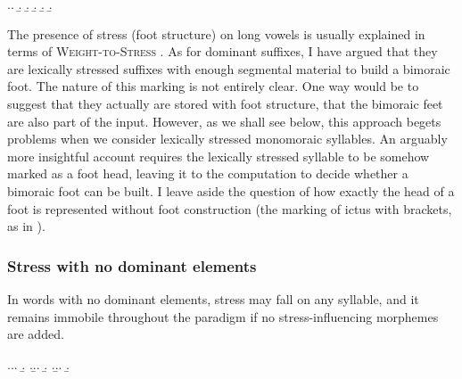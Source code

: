 \ex.\a.
\b.
\b.
\b.
\b.
\b.

The presence of stress (\ie foot structure) on long vowels is usually explained in terms of \textsc{Weight-to-Stress} \citep{prince92:_quant,ot}. As for dominant suffixes, I have argued that they are lexically stressed suffixes with enough segmental material to build a bimoraic foot. The nature of this marking is not entirely clear. One way would be to suggest that they actually are stored with foot structure, \ie that the bimoraic feet are also part of the input. However, as we shall see below, this approach begets problems when we consider lexically stressed monomoraic syllables. An arguably more insightful account requires the lexically stressed syllable to be somehow marked as a foot head, leaving it to the computation to decide whether a bimoraic foot can be built. I leave aside the question of how exactly the head of a foot is represented without foot construction (\cf the marking of ictus with brackets, as in \citealt{idsardi92,fabb08:_meter}).

\subsubsection{Stress with no dominant elements}
\label{sec:stress-with-no}

In words with no dominant elements, stress may fall on any syllable, and it remains immobile throughout the paradigm if no stress\hyp influencing morphemes are added.

\ex.\a.\a.
\b.
\z.\b.\a.
\b.
\z.\b.\a.
\b.

